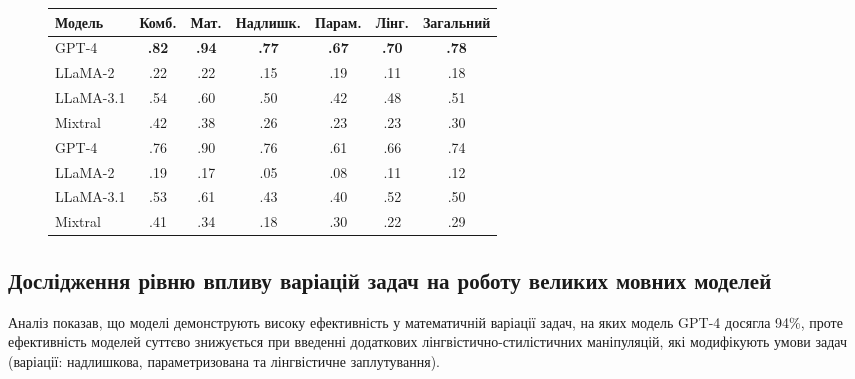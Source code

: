 \begin{figure}[!h]
    \centering 
    \small 
    \label{tab:best_model} 
    \begin{tabular}{|l|ccccc|c|}
    \hline
    Модель & Комб. & Мат. & Надлишк. & Парам. & Лінг. & Загальний \\
    \hline
    GPT-4 & \textbf{.82} & \textbf{.94} & \textbf{.77} & \textbf{.67} & \textbf{.70} & \textbf{.78} \\
    LLaMA-2 &.22 & .22 & .15 & .19 & .11 & .18 \\
    LLaMA-3.1 & .54 & .60 & .50 & .42 & .48 & .51 \\
    Mixtral & .42 & .38 & .26 & .23 & .23 & .30 \\
    \hline
    GPT-4 &  .76 & .90 & .76 & .61 & .66 & .74 \\
    LLaMA-2 & .19 & .17 & .05 & .08 & .11 & .12 \\
    LLaMA-3.1 & .53 & .61 & .43 & .40 & .52 & .50 \\
    Mixtral & .41 & .34 & .18 & .30 & .22 & .29 \\
    \hline
    \end{tabular}
\end{figure}

\subsection{Дослідження рівню впливу варіацій задач на роботу великих мовних моделей}
Аналіз показав, що моделі демонструють високу ефективність у математичній варіації задач, на яких модель GPT-4 досягла 94\%, проте ефективність моделей суттєво знижується при введенні додаткових лінгвістично-стилістичних маніпуляцій, які модифікують умови задач (варіації: надлишкова, параметризована та лінгвістичне заплутування).

